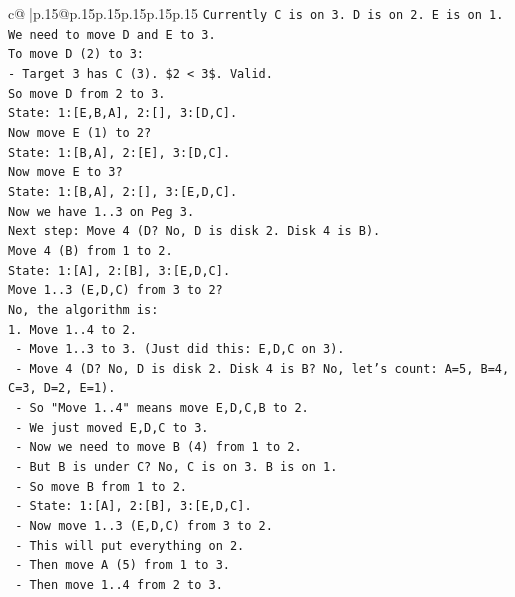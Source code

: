 \documentclass{article}
\begin{document}
{\begin{supertabular}{c@{$\;$}|p{.15\linewidth}@{}p{.15\linewidth}p{.15\linewidth}p{.15\linewidth}p{.15\linewidth}p{.15\linewidth}}
{{{\texttt{Currently C is on 3. D is on 2. E is on 1.} \\
\texttt{We need to move D and E to 3.} \\
\texttt{To move D (2) to 3:} \\
\texttt{{-} Target 3 has C (3). \$2 < 3\$. Valid.} \\
\texttt{So move D from 2 to 3.} \\
\texttt{State: 1:{[}E,B,A{]}, 2:{[}{]}, 3:{[}D,C{]}.} \\
\texttt{Now move E (1) to 2?} \\
\texttt{State: 1:{[}B,A{]}, 2:{[}E{]}, 3:{[}D,C{]}.} \\
\texttt{Now move E to 3?} \\
\texttt{State: 1:{[}B,A{]}, 2:{[}{]}, 3:{[}E,D,C{]}.} \\
\texttt{Now we have 1..3 on Peg 3.} \\
\texttt{Next step: Move 4 (D? No, D is disk 2. Disk 4 is B).} \\
\texttt{Move 4 (B) from 1 to 2.} \\
\texttt{State: 1:{[}A{]}, 2:{[}B{]}, 3:{[}E,D,C{]}.} \\
\texttt{Move 1..3 (E,D,C) from 3 to 2?} \\
\texttt{No, the algorithm is:} \\
\texttt{1. Move 1..4 to 2.} \\
\texttt{   {-} Move 1..3 to 3. (Just did this: E,D,C on 3).} \\
\texttt{   {-} Move 4 (D? No, D is disk 2. Disk 4 is B? No, let's count: A=5, B=4, C=3, D=2, E=1).} \\
\texttt{   {-} So "Move 1..4" means move E,D,C,B to 2.} \\
\texttt{   {-} We just moved E,D,C to 3.} \\
\texttt{   {-} Now we need to move B (4) from 1 to 2.} \\
\texttt{   {-} But B is under C? No, C is on 3. B is on 1.} \\
\texttt{   {-} So move B from 1 to 2.} \\
\texttt{   {-} State: 1:{[}A{]}, 2:{[}B{]}, 3:{[}E,D,C{]}.} \\
\texttt{   {-} Now move 1..3 (E,D,C) from 3 to 2.} \\
\texttt{   {-} This will put everything on 2.} \\
\texttt{   {-} Then move A (5) from 1 to 3.} \\
\texttt{   {-} Then move 1..4 from 2 to 3.} \\
}}}
\end{supertabular}}
\end{document}
